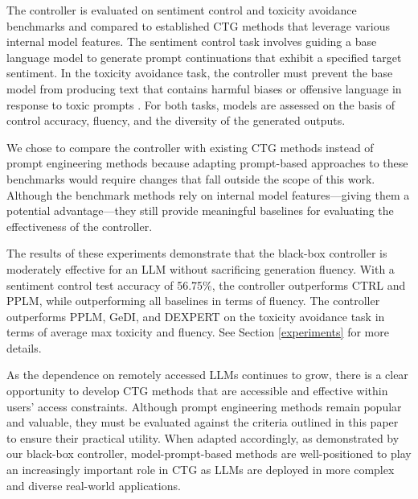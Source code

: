 \documentclass[phd,electronic,oneside,twosidetoc,letterpaper,chaptercenter,parttop,lof]{byumsphd}
\def\sentimentcontroltestaccuracy{56.75\%}
\begin{document}
The controller is evaluated on sentiment control and toxicity avoidance benchmarks and compared to established CTG methods that leverage various internal model features.
The sentiment control task involves guiding a base language model to generate prompt continuations that exhibit a specified target sentiment.
In the toxicity avoidance task, the controller must prevent the base model from producing text that contains harmful biases or offensive language in response to toxic prompts \citep{sheng2019bias, gehman2020toxicity}.
For both tasks, models are assessed on the basis of control accuracy, fluency, and the diversity of the generated outputs.

We chose to compare the controller with existing CTG methods instead of prompt engineering methods because adapting prompt-based approaches to these benchmarks would require changes that fall outside the scope of this work.
Although the benchmark methods rely on internal model features---giving them a potential advantage---they still provide meaningful baselines for evaluating the effectiveness of the controller.

The results of these experiments demonstrate that the black-box controller is moderately effective for an LLM without sacrificing generation fluency.
With a sentiment control test accuracy of \sentimentcontroltestaccuracy{}, the controller outperforms CTRL and PPLM, while outperforming all baselines in terms of fluency.
The controller outperforms PPLM, GeDI, and DEXPERT on the toxicity avoidance task in terms of average max toxicity and fluency.
See Section \ref{experiments} for more details.

As the dependence on remotely accessed LLMs continues to grow, there is a clear opportunity to develop CTG methods that are accessible and effective within users’ access constraints.
Although prompt engineering methods remain popular and valuable, they must be evaluated against the criteria outlined in this paper to ensure their practical utility.
When adapted accordingly, as demonstrated by our black-box controller, model-prompt-based methods are well-positioned to play an increasingly important role in CTG as LLMs are deployed in more complex and diverse real-world applications.
\end{document}
